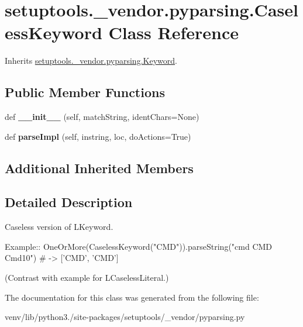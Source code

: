 \hypertarget{classsetuptools_1_1__vendor_1_1pyparsing_1_1_caseless_keyword}{}\section{setuptools.\+\_\+vendor.\+pyparsing.\+Caseless\+Keyword Class Reference}
\label{classsetuptools_1_1__vendor_1_1pyparsing_1_1_caseless_keyword}


Inherits \hyperlink{classsetuptools_1_1__vendor_1_1pyparsing_1_1_keyword}{setuptools.\+\_\+vendor.\+pyparsing.\+Keyword}.

\subsection*{Public Member Functions}
\begin{DoxyCompactItemize}
\item 
\mbox{\label{classsetuptools_1_1__vendor_1_1pyparsing_1_1_caseless_keyword_a538dc003e74aa58ef1c945b7f97ed5b6}} 
def {\bfseries \+\_\+\+\_\+init\+\_\+\+\_\+} (self, match\+String, ident\+Chars=None)
\item 
\mbox{\label{classsetuptools_1_1__vendor_1_1pyparsing_1_1_caseless_keyword_a784af5de7c8dcbe12c8a14d8320488b0}} 
def {\bfseries parse\+Impl} (self, instring, loc, do\+Actions=True)
\end{DoxyCompactItemize}
\subsection*{Additional Inherited Members}


\subsection{Detailed Description}
\begin{DoxyVerb}Caseless version of L{Keyword}.

Example::
    OneOrMore(CaselessKeyword("CMD")).parseString("cmd CMD Cmd10") # -> ['CMD', 'CMD']
    
(Contrast with example for L{CaselessLiteral}.)
\end{DoxyVerb}
 

The documentation for this class was generated from the following file\+:\begin{DoxyCompactItemize}
\item 
venv/lib/python3./site-\/packages/setuptools/\+\_\+vendor/pyparsing.\+py\end{DoxyCompactItemize}
